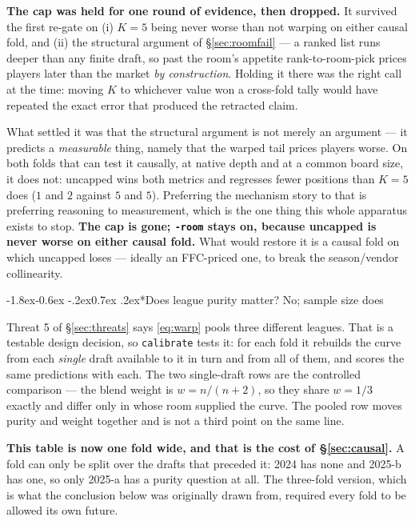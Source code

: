 \documentclass[10pt,a4paper]{article}
\makeatletter
\theoremstyle{plain}
\theoremstyle{definition}
\theoremstyle{remark}
\newcommand{\code}[1]{\texttt{\small #1}}
\renewcommand\subsubsection{\@startsection{subsubsection}{3}{\z@}%
  {-1.8ex\@plus -0.6ex \@minus -.2ex}{0.7ex \@plus .2ex}{\normalfont\normalsize\bfseries}}
\makeatother
\begin{document}
\textbf{The cap was held for one round of evidence, then dropped.} It survived the first
re-gate on (i) $K = 5$ being never worse than not warping on either causal fold, and (ii) the
structural argument of \S\ref{sec:roomfail} --- a ranked list runs deeper than any finite
draft, so past the room's appetite rank-to-room-pick prices players later than the market
\emph{by construction}. Holding it there was the right call at the time: moving $K$ to
whichever value won a cross-fold tally would have repeated the exact error that produced the
retracted claim.

What settled it was that the structural argument is not merely an argument --- it predicts a
\emph{measurable} thing, namely that the warped tail prices players worse. On both folds that
can test it causally, at native depth and at a common board size, it does not: uncapped wins
both metrics and regresses fewer positions than $K=5$ does ($1$ and $2$ against $5$ and $5$).
Preferring the mechanism story to that is preferring reasoning to measurement, which is the
one thing this whole apparatus exists to stop. \textbf{The cap is gone; \code{-room} stays on,
because uncapped is never worse on either causal fold.} What would restore it is a causal fold
on which uncapped loses --- ideally an FFC-priced one, to break the season/vendor collinearity.

\subsubsection*{Does league purity matter? No; sample size does}

Threat 5 of \S\ref{sec:threats} says \eqref{eq:warp} pools three different leagues. That is
a testable design decision, so \code{calibrate} tests it: for each fold it rebuilds the
curve from each \emph{single} draft available to it in turn and from all of them, and scores
the same predictions with each. The two single-draft rows are the controlled comparison ---
the blend weight is $w = n/(n+2)$, so they share $w = 1/3$ exactly and differ only in whose
room supplied the curve. The pooled row moves purity and weight together and is not a third
point on the same line.

\textbf{This table is now one fold wide, and that is the cost of \S\ref{sec:causal}.} A
fold can only be split over the drafts that preceded it: 2024 has none and 2025-b has one,
so only 2025-a has a purity question at all. The three-fold version, which is what the
conclusion below was originally drawn from, required every fold to be allowed its own
future.
\end{document}
